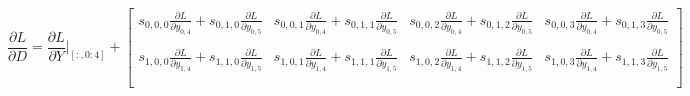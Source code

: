 \documentclass{article}
\begin{document}
$$
\frac{\partial L}{\partial D} = \frac{\partial L}{\partial Y}|_{[:,0:4]}+
\begin{bmatrix}
    s_{0,0,0}\frac{\partial L}{\partial y_{0,4}}+s_{0,1,0}\frac{\partial L}{\partial y_{0,5}} & s_{0,0,1}\frac{\partial L}{\partial y_{0,4}}+s_{0,1,1}\frac{\partial L}{\partial y_{0,5}} & s_{0,0,2}\frac{\partial L}{\partial y_{0,4}}+s_{0,1,2}\frac{\partial L}{\partial y_{0,5}} & s_{0,0,3}\frac{\partial L}{\partial y_{0,4}}+s_{0,1,3}\frac{\partial L}{\partial y_{0,5}} \\\\
    s_{1,0,0}\frac{\partial L}{\partial y_{1,4}}+s_{1,1,0}\frac{\partial L}{\partial y_{1,5}} & s_{1,0,1}\frac{\partial L}{\partial y_{1,4}}+s_{1,1,1}\frac{\partial L}{\partial y_{1,5}} & s_{1,0,2}\frac{\partial L}{\partial y_{1,4}}+s_{1,1,2}\frac{\partial L}{\partial y_{1,5}} & s_{1,0,3}\frac{\partial L}{\partial y_{1,4}}+s_{1,1,3}\frac{\partial L}{\partial y_{1,5}} \\\\
\end{bmatrix}
$$
\end{document}
